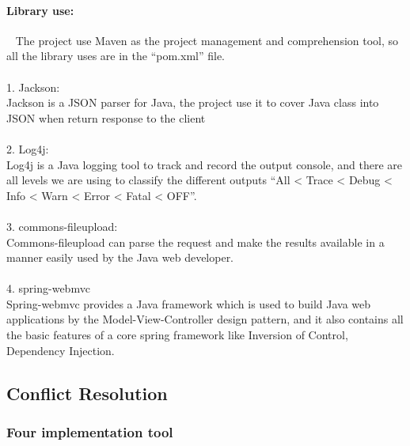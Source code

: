 \documentclass[12pt,a4]{article}
\begin{document}
\paragraph{Library use:}~{}
\newline
The project use Maven as the project management and comprehension tool, so all the library uses are in the “pom.xml” file.\\\\
1. Jackson:\\
Jackson is a JSON parser for Java, the project use it to cover Java class into JSON when return response to the client\\\\
2. Log4j:\\
Log4j is a Java logging tool to track and record the output console, and there are all levels we are using to classify the different outputs “All < Trace < Debug < Info < Warn < Error < Fatal < OFF”.\\\\
3. commons-fileupload:\\
Commons-fileupload can parse the request and make the results available in a manner easily used by the Java web developer.\\\\
4. spring-webmvc\\
Spring-webmvc provides a Java framework which is used to build Java web applications by the Model-View-Controller design pattern, and it also contains all the basic features of a core spring framework like Inversion of Control, Dependency Injection.

\subsection{Conflict Resolution}\label{4.2}
\subsubsection{Four implementation tool}\label{4.2.1}
\end{document}

